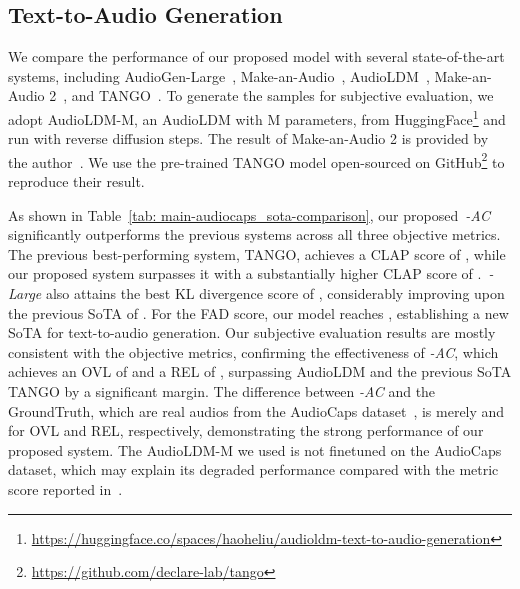 \documentclass[lettersize,journal]{IEEEtran}
\begin{document}
\subsection{Text-to-Audio Generation}
\noindent
We compare the performance of our proposed model with several state-of-the-art systems, including AudioGen-Large~\cite{kreuk2022audiogen}, Make-an-Audio~\cite{huang2023make-an-audio}, AudioLDM~\cite{liu2023audioldm}, Make-an-Audio 2~\cite{huang2023make-an-audio-2}, and TANGO~\cite{ghosal2023text-tango}. To generate the samples for subjective evaluation, we adopt AudioLDM-M, an AudioLDM with M parameters, from HuggingFace\footnote{\url{https://huggingface.co/spaces/haoheliu/audioldm-text-to-audio-generation}} and run with  reverse diffusion steps. 
The result of Make-an-Audio 2 is provided by the author~\cite{huang2023make-an-audio-2}. We use the pre-trained TANGO model open-sourced on GitHub\footnote{\url{https://github.com/declare-lab/tango}} to reproduce their result. 

As shown in Table~\ref{tab: main-audiocaps_sota-comparison}, our proposed~\vModelName\textit{-AC} significantly outperforms the previous systems across all three objective metrics. The previous best-performing system, TANGO, achieves a CLAP score of , while our proposed system surpasses it with a substantially higher CLAP score of .~\vModelName\textit{-Large} also attains the best KL divergence score of , considerably improving upon the previous SoTA of . 
For the FAD score, our model reaches , establishing a new SoTA for text-to-audio generation. Our subjective evaluation results are mostly consistent with the objective metrics, confirming the effectiveness of \vModelName\textit{-AC}, which achieves an OVL of  and a REL of , surpassing AudioLDM and the previous SoTA TANGO by a significant margin. The difference between \vModelName\textit{-AC} and the GroundTruth, which are real audios from the AudioCaps dataset~\cite{kim2019audiocaps}, is merely  and  for OVL and REL, respectively, demonstrating the strong performance of our proposed system.
The AudioLDM-M we used is not finetuned on the AudioCaps dataset, which may explain its degraded performance compared with the metric score reported in~\cite{liu2023audioldm}. 
\end{document}
